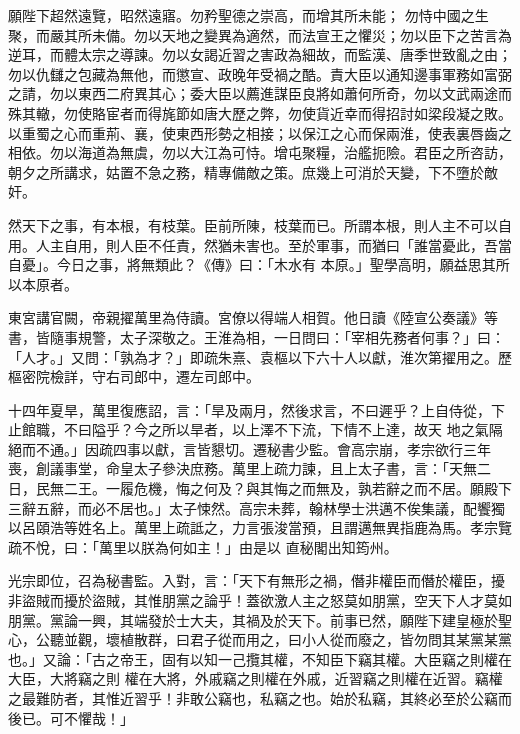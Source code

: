 \begin{pinyinscope}
 願陛下超然遠覽，昭然遠寤。勿矜聖德之崇高，而增其所未能；
 勿恃中國之生聚，而嚴其所未備。勿以天地之變異為適然，而法宣王之懼災；勿以臣下之苦言為逆耳，而體太宗之導諫。勿以女謁近習之害政為細故，而監漢、唐季世致亂之由；勿以仇讎之包藏為無他，而懲宣、政晚年受禍之酷。責大臣以通知邊事軍務如富弼之請，勿以東西二府異其心；委大臣以薦進謀臣良將如蕭何所奇，勿以文武兩途而殊其轍，勿使賂宦者而得旄節如唐大歷之弊，勿使貨近幸而得招討如梁段凝之敗。
 以重蜀之心而重荊、襄，使東西形勢之相接；以保江之心而保兩淮，使表裏唇齒之相依。勿以海道為無虞，勿以大江為可恃。增屯聚糧，治艦扼險。君臣之所咨訪，朝夕之所講求，姑置不急之務，精專備敵之策。庶幾上可消於天變，下不墮於敵奸。



 然天下之事，有本根，有枝葉。臣前所陳，枝葉而已。所謂本根，則人主不可以自用。人主自用，則人臣不任責，然猶未害也。至於軍事，而猶曰「誰當憂此，吾當自憂」。今日之事，將無類此？《傳》曰：「木水有
 本原。」聖學高明，願益思其所以本原者。



 東宮講官闕，帝親擢萬里為侍讀。宮僚以得端人相賀。他日讀《陸宣公奏議》等書，皆隨事規警，太子深敬之。王淮為相，一日問曰：「宰相先務者何事？」曰：「人才。」又問：「孰為才？」即疏朱熹、袁樞以下六十人以獻，淮次第擢用之。歷樞密院檢詳，守右司郎中，遷左司郎中。



 十四年夏旱，萬里復應詔，言：「旱及兩月，然後求言，不曰遲乎？上自侍從，下止館職，不曰隘乎？今之所以旱者，以上澤不下流，下情不上達，故天
 地之氣隔絕而不通。」因疏四事以獻，言皆懇切。遷秘書少監。會高宗崩，孝宗欲行三年喪，創議事堂，命皇太子參決庶務。萬里上疏力諫，且上太子書，言：「天無二日，民無二王。一履危機，悔之何及？與其悔之而無及，孰若辭之而不居。願殿下三辭五辭，而必不居也。」太子悚然。高宗未葬，翰林學士洪邁不俟集議，配饗獨以呂頤浩等姓名上。萬里上疏詆之，力言張浚當預，且謂邁無異指鹿為馬。孝宗覽疏不悅，曰：「萬里以朕為何如主！」由是以
 直秘閣出知筠州。



 光宗即位，召為秘書監。入對，言：「天下有無形之禍，僭非權臣而僭於權臣，擾非盜賊而擾於盜賊，其惟朋黨之論乎！蓋欲激人主之怒莫如朋黨，空天下人才莫如朋黨。黨論一興，其端發於士大夫，其禍及於天下。前事已然，願陛下建皇極於聖心，公聽並觀，壞植散群，曰君子從而用之，曰小人從而廢之，皆勿問其某黨某黨也。」又論：「古之帝王，固有以知一己攬其權，不知臣下竊其權。大臣竊之則權在大臣，大將竊之則
 權在大將，外戚竊之則權在外戚，近習竊之則權在近習。竊權之最難防者，其惟近習乎！非敢公竊也，私竊之也。始於私竊，其終必至於公竊而後已。可不懼哉！」




\end{pinyinscope}
